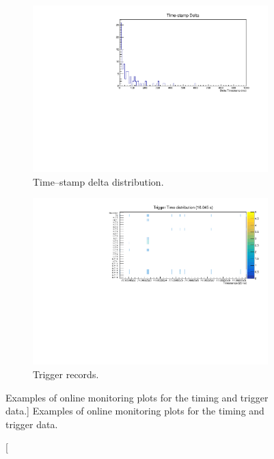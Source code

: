 \begin{figure}

	\centering

	\begin{subfigure}[b]{0.8\textwidth}
		\centering
		\vspace{3mm}
		\includegraphics[width=\textwidth]{figures/timestamp_delta.pdf}
		\caption {Time--stamp delta distribution.}
		\label{fig:timestamp_delta}
	\end{subfigure}

	\begin{subfigure}[b]{0.8\textwidth}
		\centering
		\vspace{3mm}
		\includegraphics[width=\textwidth]{figures/trigger_record.pdf}
		\caption {Trigger records.}
		\label{fig:trig_record}
	\end{subfigure}

	\caption
	[Examples of online monitoring plots for the timing and trigger data.]
	{Examples of online monitoring plots for the timing and trigger data.}
	\label{fig:timing_OM}

\end{figure}

